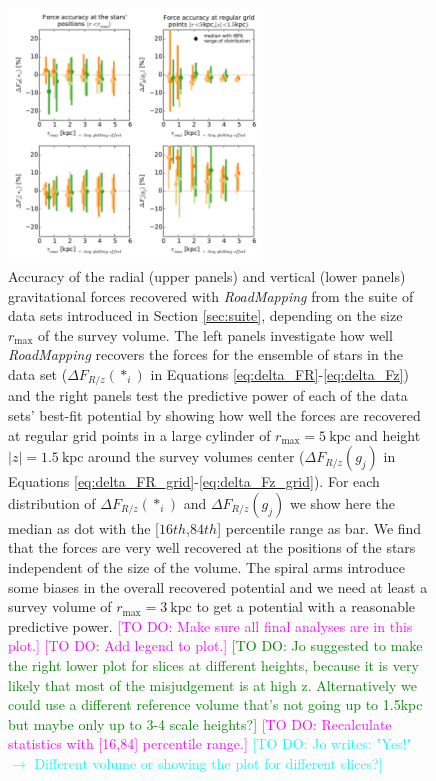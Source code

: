 \documentclass[iop,revtex4,numberedappendix,appendixfloats]{emulateapj}
\newcommand{\RM}{{\sl RoadMapping}}
\newcommand{\Wilma}[1]{\textcolor{Magenta}{#1}}
\newcommand{\HW}[1]{\textcolor{Green}{#1}}
\newcommand{\Jo}[1]{\textcolor{Cyan}{#1}}
\begin{document}
\begin{figure}[!htbp]
\centering
\includegraphics[width=0.6\textwidth]{fig/MNdHHdiffSph2_bias_in_forces_recovery_2.pdf}
\caption{Accuracy of the radial (upper panels) and vertical (lower panels) gravitational forces recovered with \RM{} from the suite of data sets introduced in Section \ref{sec:suite}, depending on the size $r_\text{max}$ of the survey volume. The left panels investigate how well \RM{} recovers the forces for the ensemble of stars in the data set ($\Delta F_{R/z}(*_i)$ in Equations \eqref{eq:delta_FR}-\eqref{eq:delta_Fz}) and the right panels test the predictive power of each of the data sets' best-fit potential by showing how well the forces are recovered at regular grid points in a large cylinder of $r_\text{max}=5~\text{kpc}$ and height $|z|=1.5~\text{kpc}$ around the survey volumes center ($\Delta F_{R/z}(g_j)$ in Equations \eqref{eq:delta_FR_grid}-\eqref{eq:delta_Fz_grid}). For each distribution of $\Delta F_{R/z}(*_i)$ and $\Delta F_{R/z}(g_j)$ we show here the median as dot with the  [$16th$,$84th$] percentile range as bar. We find that the forces are very well recovered at the positions of the stars independent of the size of the volume. The spiral arms introduce some biases in the overall recovered potential and we need at least a survey volume of $r_\text{max}=3~\text{kpc}$ to get a potential with a reasonable predictive power. \Wilma{[TO DO: Make sure all final analyses are in this plot.]} \Wilma{[TO DO: Add legend to plot.]} \HW{[TO DO: Jo suggested to make the right lower plot for slices at different heights, because it is very likely that most of the misjudgement is at high z. Alternatively we could use a different reference volume that's not going up to 1.5kpc but maybe only up to 3-4 scale heights?]} \Wilma{[TO DO: Recalculate statistics with [16,84] percentile range.]} \Jo{[TO DO: Jo writes: "Yes!" $\longrightarrow$ Different volume or showing the plot for different slices?]}}
\label{fig:forces_bias}
\end{figure}
\end{document}
